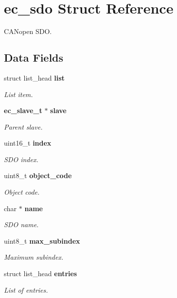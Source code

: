 \section{ec\-\_\-sdo Struct Reference}
\label{structec__sdo}


C\-A\-Nopen S\-D\-O.  


\subsection*{Data Fields}
\begin{DoxyCompactItemize}
\item 
struct list\-\_\-head {\bf list}
\begin{DoxyCompactList}\small\item\em List item. \end{DoxyCompactList}\item 
{\bf ec\-\_\-slave\-\_\-t} $\ast$ {\bf slave}
\begin{DoxyCompactList}\small\item\em Parent slave. \end{DoxyCompactList}\item 
uint16\-\_\-t {\bf index}
\begin{DoxyCompactList}\small\item\em S\-D\-O index. \end{DoxyCompactList}\item 
uint8\-\_\-t {\bf object\-\_\-code}
\begin{DoxyCompactList}\small\item\em Object code. \end{DoxyCompactList}\item 
char $\ast$ {\bf name}
\begin{DoxyCompactList}\small\item\em S\-D\-O name. \end{DoxyCompactList}\item 
uint8\-\_\-t {\bf max\-\_\-subindex}
\begin{DoxyCompactList}\small\item\em Maximum subindex. \end{DoxyCompactList}\item 
struct list\-\_\-head {\bf entries}
\begin{DoxyCompactList}\small\item\em List of entries. \end{DoxyCompactList}\end{DoxyCompactItemize}


